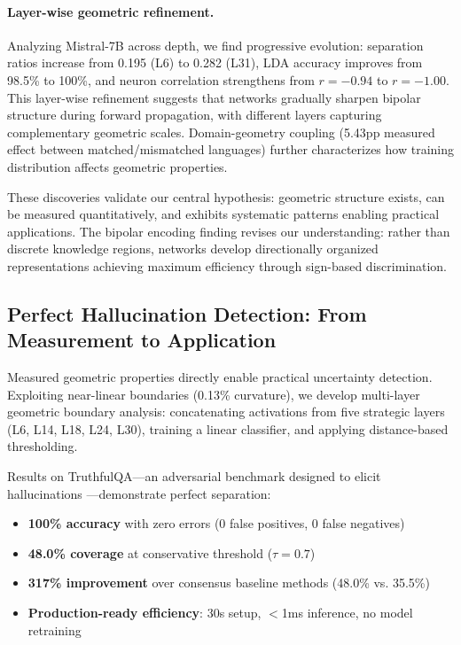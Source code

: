 \documentclass[11pt]{article}
\begin{document}
\paragraph{Layer-wise geometric refinement.} Analyzing Mistral-7B across depth, we find progressive evolution: separation ratios increase from 0.195 (L6) to 0.282 (L31), LDA accuracy improves from 98.5\% to 100\%, and neuron correlation strengthens from $r = -0.94$ to $r = -1.00$. This layer-wise refinement suggests that networks gradually sharpen bipolar structure during forward propagation, with different layers capturing complementary geometric scales. Domain-geometry coupling (5.43pp measured effect between matched/mismatched languages) further characterizes how training distribution affects geometric properties.

These discoveries validate our central hypothesis: geometric structure exists, can be measured quantitatively, and exhibits systematic patterns enabling practical applications. The bipolar encoding finding revises our understanding: rather than discrete knowledge regions, networks develop directionally organized representations achieving maximum efficiency through sign-based discrimination.

\subsection{Perfect Hallucination Detection: From Measurement to Application}
\label{sec:intro-application}

Measured geometric properties directly enable practical uncertainty detection. Exploiting near-linear boundaries (0.13\% curvature), we develop multi-layer geometric boundary analysis: concatenating activations from five strategic layers (L6, L14, L18, L24, L30), training a linear classifier, and applying distance-based thresholding.

Results on TruthfulQA---an adversarial benchmark designed to elicit hallucinations \citep{lin2022truthfulqa}---demonstrate perfect separation:
\begin{itemize}
\item \textbf{100\% accuracy} with zero errors (0 false positives, 0 false negatives)
\item \textbf{48.0\% coverage} at conservative threshold ($\tau = 0.7$)
\item \textbf{317\% improvement} over consensus baseline methods (48.0\% vs. 35.5\%)
\item \textbf{Production-ready efficiency}: 30s setup, $<$1ms inference, no model retraining
\end{itemize}
\end{document}
